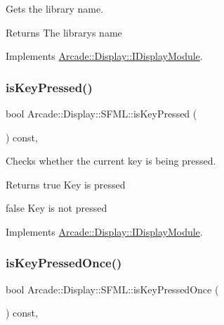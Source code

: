 Gets the library name. 

\begin{DoxyReturn}{Returns}
The library\textquotesingle{}s name 
\end{DoxyReturn}


Implements \mbox{\hyperlink{classArcade_1_1Display_1_1IDisplayModule_a0d8e957815e94766bdefbd7a5043e81a}{Arcade\+::\+Display\+::\+I\+Display\+Module}}.

\mbox{\label{classArcade_1_1Display_1_1SFML_a760b5a751030b18d6c92eed5640f2c76}} 
\subsubsection{\texorpdfstring{isKeyPressed()}{isKeyPressed()}}
{\footnotesize\ttfamily bool Arcade\+::\+Display\+::\+S\+F\+M\+L\+::is\+Key\+Pressed (\begin{DoxyParamCaption}\item[{\mbox{\hyperlink{classArcade_1_1Display_1_1IDisplayModule_a8da3f6b309ca0581473ae8cc8789b619}{I\+Display\+Module\+::\+Keys}}}]{ }\end{DoxyParamCaption}) const\hspace{0.3cm}{\ttfamily [final]}, {\ttfamily [virtual]}}



Checks whether the current key is being pressed. 

\begin{DoxyReturn}{Returns}
true Key is pressed 

false Key is not pressed 
\end{DoxyReturn}


Implements \mbox{\hyperlink{classArcade_1_1Display_1_1IDisplayModule_ab3d02b76c08ff2deb728dc9f0d557f43}{Arcade\+::\+Display\+::\+I\+Display\+Module}}.

\mbox{\label{classArcade_1_1Display_1_1SFML_a499cc23f5567f0d9f8a9ba71cf30add9}} 
\subsubsection{\texorpdfstring{isKeyPressedOnce()}{isKeyPressedOnce()}}
{\footnotesize\ttfamily bool Arcade\+::\+Display\+::\+S\+F\+M\+L\+::is\+Key\+Pressed\+Once (\begin{DoxyParamCaption}\item[{\mbox{\hyperlink{classArcade_1_1Display_1_1IDisplayModule_a8da3f6b309ca0581473ae8cc8789b619}{I\+Display\+Module\+::\+Keys}}}]{ }\end{DoxyParamCaption}) const\hspace{0.3cm}{\ttfamily [final]}, {\ttfamily [virtual]}}



